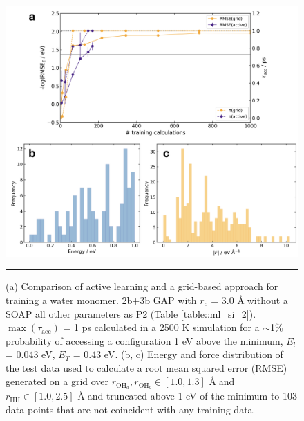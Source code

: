 \documentclass[../../main.tex]{subfiles}
\begin{document}
\begin{figure}[h!]
	\vspace{0.4cm}
	\centering
	\includegraphics[width=\textwidth]{6/gap/figs_si/fig2}
	\vspace{0.2cm}
	\hrule
	\caption{(a) Comparison of active learning and a grid-based approach for training a water monomer. 2b+3b GAP with $r_c$ = 3.0 \AA$\;$without a SOAP all other parameters as P2 (Table \ref{table::ml_si_2}). $\max(\tau_\text{acc})$ = 1 ps calculated in a 2500 K simulation for a $\sim$1\% probability of accessing a configuration 1 eV above the minimum, $E_l$ = 0.043 eV, $E_T$ = 0.43 eV. (b, c) Energy and force distribution of the test data used to calculate a root mean squared error (RMSE) generated on a grid over $r_{\text{OH}_a}, r_{\text{OH}_b} \in [1.0, 1.3]$ \AA$\;$and $r_{\text{HH}} \in  [1.0, 2.5]$ \AA$\;$and truncated above 1 eV of the minimum to 103 data points that are not coincident with any training data.}
	\label{fig::ml_si_2}
\end{figure}
\end{document}

